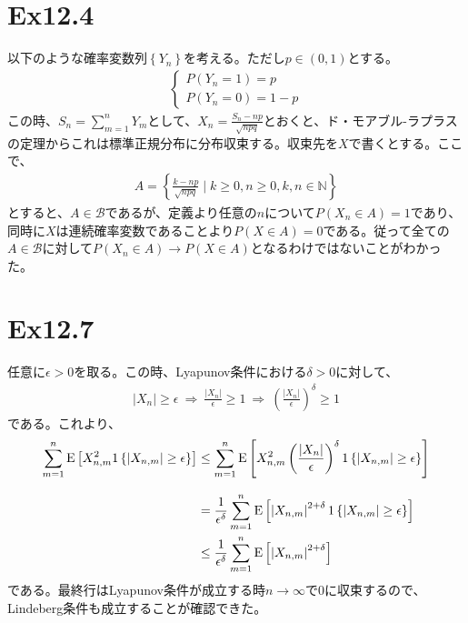 \documentclass{article}
\begin{document}
\section{Ex12.4}
以下のような確率変数列$\left\{ Y_n \right\}$を考える。ただし$p\in (0,1)$とする。
\begin{align*}
\begin{cases}
	P\left( Y_n = 1 \right) = p\\[8pt]
	P\left( Y_n = 0 \right) = 1-p
\end{cases}
\end{align*}
この時、$S_n = \sum_{m=1}^n Y_m$として、$X_n = \frac{S_n -np}{\sqrt{npq}}$とおくと、ド・モアブル-ラプラスの定理からこれは標準正規分布に分布収束する。収束先を$X$で書くとする。ここで、
\begin{align*}
	A = \left\{ \frac{k-np}{\sqrt{npq}} \mid k \geq 0, n\geq 0, k,n \in \mathbb{N} \right\}
\end{align*}
とすると、$A\in \mathcal{B}$であるが、定義より任意の$n$について$P\left( X_n \in A \right) = 1$であり、同時に$X$は連続確率変数であることより$P\left( X \in A \right) = 0$である。従って全ての$A\in \mathcal{B}$に対して$P\left( X_n \in A \right)\to P\left( X\in A\right)$となるわけではないことがわかった。

\section{Ex12.7}
任意に$\epsilon > 0$を取る。この時、Lyapunov条件における$\delta > 0$に対して、
\begin{align*}
	\left| X_n \right| \geq \epsilon \ \Rightarrow\ \frac{\left| X_n \right|}{\epsilon} \geq 1\ \Rightarrow\ \left(  \frac{\left| X_n \right|}{\epsilon} \right)^{\delta} \geq 1
\end{align*}
である。これより、
\begin{align*}
	\sum_{m=1}^n {\rm E}\left[ X_{n,m}^2 1\left\{ \left| X_{n,m} \right| \geq \epsilon \right\} \right] &\leq \sum_{m=1}^n {\rm E}\left[ X_{n,m}^2  \left(  \frac{\left| X_n \right|}{\epsilon} \right)^{\delta} 1\left\{ \left| X_{n,m} \right| \geq \epsilon \right\} \right] \\[8pt]
	&=\frac{1}{\epsilon^{\delta}} \sum_{m=1}^n {\rm E}\left[ \left| X_{n,m} \right|^{2+\delta} 1\left\{ \left| X_{n,m} \right| \geq \epsilon \right\} \right]\\
	&\leq \frac{1}{\epsilon^{\delta}} \sum_{m=1}^n {\rm E}\left[ \left| X_{n,m} \right|^{2+\delta} \right]
\end{align*}
である。最終行はLyapunov条件が成立する時$n\to \infty$で$0$に収束するので、Lindeberg条件も成立することが確認できた。
\end{document}
